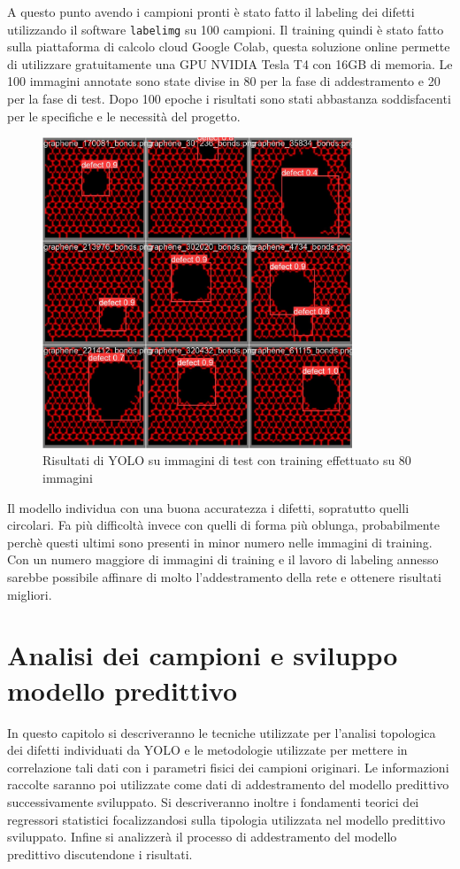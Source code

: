 \documentclass[12pt,a4paper,openright,twoside]{report}
\begin{document}
A questo punto avendo i campioni pronti è stato fatto il labeling dei difetti utilizzando il software \texttt{labelimg} su 100 campioni. 
Il training quindi è stato fatto sulla piattaforma di calcolo cloud Google Colab, questa soluzione online permette di utilizzare gratuitamente una GPU NVIDIA Tesla T4 con 16GB di memoria.
Le 100 immagini annotate sono state divise in 80 per la fase di addestramento e 20 per la fase di test. 
Dopo 100 epoche i risultati sono stati abbastanza soddisfacenti per le specifiche e le necessità del progetto. 
\begin{figure}[h]
\centering
\includegraphics[width=350px,keepaspectratio]{outputYOLOreduced.jpg}
\caption{Risultati di YOLO su immagini di test con training effettuato su 80 immagini}
\end{figure}
\newpage
Il modello individua con una buona accuratezza i difetti, sopratutto quelli circolari. Fa più difficoltà invece con quelli di forma più oblunga, probabilmente perchè questi ultimi sono presenti in minor numero nelle immagini di training. 
Con un numero maggiore di immagini di training e il lavoro di labeling annesso sarebbe possibile affinare di molto l'addestramento della rete e ottenere risultati migliori. \\

{\let\clearpage\relax \chapter{Analisi dei campioni e sviluppo modello predittivo}}
In questo capitolo si descriveranno le tecniche utilizzate per l'analisi topologica dei difetti individuati da YOLO e le metodologie utilizzate per mettere in correlazione tali dati con i parametri fisici dei campioni originari.
Le informazioni raccolte saranno poi utilizzate come dati di addestramento del modello predittivo successivamente sviluppato. 
Si descriveranno inoltre i fondamenti teorici dei regressori statistici focalizzandosi sulla tipologia utilizzata nel modello predittivo sviluppato. 
Infine si analizzerà il processo di addestramento del modello predittivo discutendone i risultati. 
\end{document}
